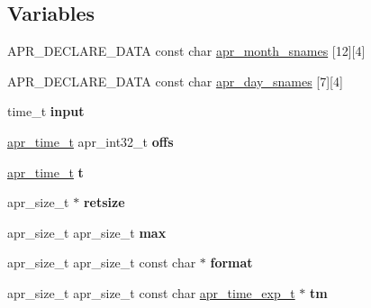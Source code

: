 \subsection*{Variables}
\begin{DoxyCompactItemize}
\item 
A\+P\+R\+\_\+\+D\+E\+C\+L\+A\+R\+E\+\_\+\+D\+A\+TA const char \mbox{\hyperlink{group__apr__time_ga4307e6d6e3a6e60af902edc4743723ee}{apr\+\_\+month\+\_\+snames}} \mbox{[}12\mbox{]}\mbox{[}4\mbox{]}
\item 
A\+P\+R\+\_\+\+D\+E\+C\+L\+A\+R\+E\+\_\+\+D\+A\+TA const char \mbox{\hyperlink{group__apr__time_ga7deb42a36f677bf27da84151f7df74dc}{apr\+\_\+day\+\_\+snames}} \mbox{[}7\mbox{]}\mbox{[}4\mbox{]}
\item 
\mbox{\label{group__apr__time_gaaea76414c264b92d2f4b780d143e7b82}} 
time\+\_\+t {\bfseries input}
\item 
\mbox{\label{group__apr__time_ga9bcfe551980c06f6cc21a62387c90920}} 
\mbox{\hyperlink{group__apr__time_gadb4bde16055748190eae190c55aa02bb}{apr\+\_\+time\+\_\+t}} apr\+\_\+int32\+\_\+t {\bfseries offs}
\item 
\mbox{\label{group__apr__time_gabfa74bb4f05f3b2de1a89160025e5400}} 
\mbox{\hyperlink{group__apr__time_gadb4bde16055748190eae190c55aa02bb}{apr\+\_\+time\+\_\+t}} {\bfseries t}
\item 
\mbox{\label{group__apr__time_gad002c9861f62c612b3224a3b98253b31}} 
apr\+\_\+size\+\_\+t $\ast$ {\bfseries retsize}
\item 
\mbox{\label{group__apr__time_gabd53dba8aa2b6aef034e67569fedebfc}} 
apr\+\_\+size\+\_\+t apr\+\_\+size\+\_\+t {\bfseries max}
\item 
\mbox{\label{group__apr__time_ga6427c3237144d9709aa13825289f0b78}} 
apr\+\_\+size\+\_\+t apr\+\_\+size\+\_\+t const char $\ast$ {\bfseries format}
\item 
\mbox{\label{group__apr__time_ga3ea988e6273ca725c8210dcfdc48402f}} 
apr\+\_\+size\+\_\+t apr\+\_\+size\+\_\+t const char \mbox{\hyperlink{structapr__time__exp__t}{apr\+\_\+time\+\_\+exp\+\_\+t}} $\ast$ {\bfseries tm}
\end{DoxyCompactItemize}


